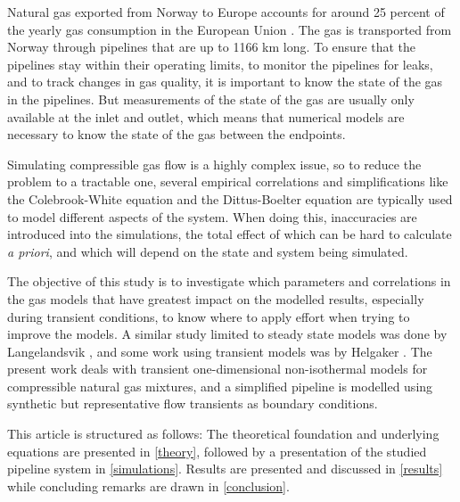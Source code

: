 Natural gas exported from Norway to Europe accounts for around 25 percent of the yearly gas consumption in the European Union%
. The gas is transported from Norway through pipelines that are up to 1166 km long. %
To ensure that the pipelines stay within their operating limits, to monitor the pipelines for leaks, and to track changes in gas quality, %
it is important to know the state of the gas in the pipelines. %
But measurements of the state of the gas are usually only available at the inlet and outlet, which means that numerical models are necessary to know the state of the gas between the endpoints. 

Simulating compressible gas flow is a highly complex issue, so to reduce the problem to a tractable one, several empirical correlations and simplifications like the Colebrook-White equation \cite{Colebrook1939Turbulent} and the Dittus-Boelter equation \cite{Winterton1998Where,Dittus1985Heat} are typically used to model different aspects of the system. When doing this, inaccuracies are introduced into the simulations, the total effect of which can be hard to calculate \emph{a priori}, and which will depend on the state and system being simulated. 

The objective of this study is to investigate which parameters and correlations in the gas models that have greatest impact on the modelled results, especially during transient conditions, to know where to apply effort when trying to improve the models. A similar study limited to steady state models was done by Langelandsvik \cite{Langelandsvik2008Modeling}, and some work using transient models was by Helgaker \cite{Helgaker2013Modeling}. The present work deals with transient one-dimensional non-isothermal models for compressible natural gas mixtures, and a simplified pipeline is modelled using synthetic but representative flow transients as boundary conditions.

This article is structured as follows: The theoretical foundation and underlying equations are presented in \cref{theory}, followed by a presentation of the studied pipeline system in \cref{simulations}. Results are presented and discussed in \cref{results} while concluding remarks are drawn in \cref{conclusion}.